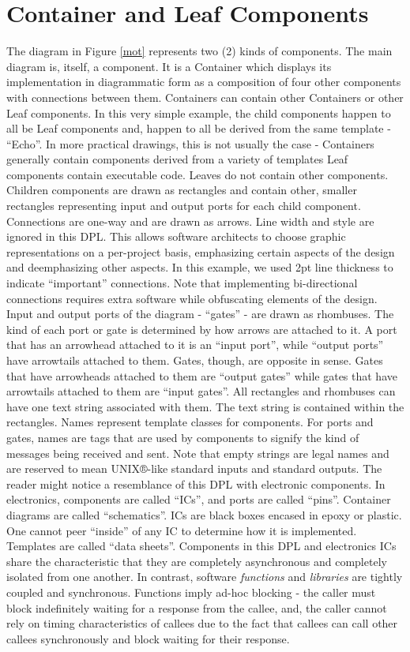 \documentclass[10pt,anonymous,review]{acmart}
\begin{document}
\section{Container and Leaf Components} \label{containerleaf}
The diagram in Figure \ref{mot} represents two (2) kinds of components.
The main diagram is, itself, a component. It is a Container which displays its implementation in diagrammatic form as a composition of four other components with connections between them.
Containers can contain other Containers or other Leaf components. In this very simple example, the child components happen to all be Leaf components and, happen to all be derived from the same template - “Echo”. In more practical drawings, this is not usually the case - Containers generally contain components derived from a variety of templates
Leaf components contain executable code. Leaves do not contain other components.
Children components are drawn as rectangles and contain other, smaller rectangles representing input and output ports for each child component.
Connections are one-way and are drawn as arrows. Line width and style are ignored in this DPL. This allows software architects to choose graphic representations on a per-project basis, emphasizing certain aspects of the design and deemphasizing other aspects. In this example, we used 2pt line thickness to indicate “important” connections. Note that implementing bi-directional connections requires extra software while obfuscating elements of the design.
Input and output ports of the diagram - “gates” - are drawn as rhombuses. 
The kind of each port or gate is determined by how arrows are attached to it. A port that has an arrowhead attached to it is an “input port”, while “output ports” have arrowtails attached to them. Gates, though, are opposite in sense. Gates that have arrowheads attached to them are “output gates” while gates that have arrowtails attached to them are “input gates”.
All rectangles and rhombuses can have one text string associated with them. The text string is contained within the rectangles. Names represent template classes for components. For ports and gates, names are tags that are used by components to signify the kind of messages being received and sent. Note that empty strings are legal names and are reserved to mean UNIX®-like standard inputs and standard outputs.
The reader might notice a resemblance of this DPL with electronic components. In electronics, components are called “ICs”, and ports are called “pins”. Container diagrams are called “schematics”. ICs are black boxes encased in epoxy or plastic. One cannot peer “inside” of any IC to determine how it is implemented. Templates are called “data sheets”. Components in this DPL and electronics ICs share the characteristic that they are completely asynchronous and completely isolated from one another. In contrast, software \emph{functions} and \emph{libraries} are tightly coupled and synchronous. Functions imply ad-hoc blocking - the caller must block indefinitely waiting for a response from the callee, and, the caller cannot rely on timing characteristics of callees due to the fact that callees can call other callees synchronously and block waiting for their response. 
\end{document}

